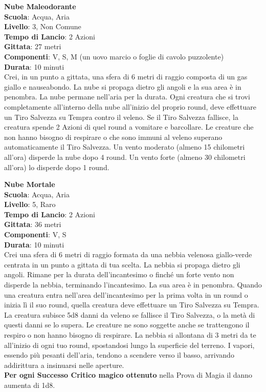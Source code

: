 \begin{multicols}{2}
\medskip\textbf{Nube Maleodorante}\\
\textbf{Scuola}: Acqua, Aria\\
\textbf{Livello}: 3, Non Comune\\
\textbf{Tempo di Lancio}: 2 Azioni\\
\textbf{Gittata}: 27 metri\\
\textbf{Componenti}: V, S, M (un uovo marcio o foglie di cavolo puzzolente)\\
\textbf{Durata}: 10 minuti\\
Crei, in un punto a gittata, una sfera di 6 metri di raggio composta di un gas giallo e nauseabondo. La nube si propaga dietro gli angoli e la sua area è in penombra. La nube permane nell'aria per la durata. Ogni creatura che si trovi completamente all'interno della nube all'inizio del proprio round, deve effettuare un Tiro Salvezza su Tempra contro il veleno. Se il Tiro Salvezza fallisce, la creatura spende 2 Azioni di quel round a vomitare e barcollare. Le creature che non hanno bisogno di respirare o che sono immuni al veleno superano automaticamente il Tiro Salvezza. Un vento moderato (almeno 15 chilometri all'ora) disperde la nube dopo 4 round. Un vento forte (almeno 30 chilometri all'ora) lo disperde dopo 1 round.

\medskip\textbf{Nube Mortale}\\
\textbf{Scuola}: Acqua, Aria\\
\textbf{Livello}: 5, Raro\\
\textbf{Tempo di Lancio}: 2 Azioni\\
\textbf{Gittata}: 36 metri\\
\textbf{Componenti}: V, S\\
\textbf{Durata}: 10 minuti \\
Crei una sfera di 6 metri di raggio formata da una nebbia velenosa giallo-verde centrata in un punto a gittata di tua scelta. La nebbia si propaga dietro gli angoli. Rimane per la durata dell'incantesimo o finché un forte vento non disperde la nebbia, terminando l'incantesimo. La sua area è in penombra. Quando una creatura entra nell'area dell'incantesimo per la prima volta in un round o inizia lì il suo round, quella creatura deve effettuare un Tiro Salvezza su Tempra. La creatura subisce 5d8 danni da veleno se fallisce il Tiro Salvezza, o la metà di questi danni se lo supera. Le creature ne sono soggette anche se trattengono il respiro o non hanno bisogno di respirare. La nebbia si allontana di 3 metri da te all'inizio di ogni tuo round, spostandosi lungo la superficie del terreno. I vapori, essendo più pesanti dell'aria, tendono a scendere verso il basso, arrivando addirittura a insinuarsi nelle aperture.\\
\textbf{Per ogni Successo Critico magico ottenuto} nella Prova di Magia il danno aumenta di 1d8.


\end{multicols}

